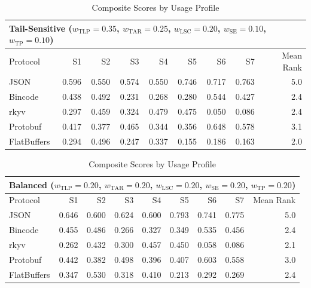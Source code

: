 \begin{table}[htbp]
\centering
\caption{Composite Scores by Usage Profile}
\label{tab:composite_scores}
\begin{tabular}{lrrrrrrrr}
\hline
\multicolumn{9}{l}{\textbf{Tail-Sensitive} ($w_{\mathrm{TLP}}=0.35$, $w_{\mathrm{TAR}}=0.25$, $w_{\mathrm{LSC}}=0.20$, $w_{\mathrm{SE}}=0.10$, $w_{\mathrm{TP}}=0.10$)} \\
\hline
Protocol & S1 & S2 & S3 & S4 & S5 & S6 & S7 & Mean Rank \\
\hline
  JSON & 0.596 & 0.550 & 0.574 & 0.550 & 0.746 & 0.717 & 0.763 & 5.0 \\
  Bincode & 0.438 & 0.492 & 0.231 & 0.268 & 0.280 & 0.544 & 0.427 & 2.4 \\
  rkyv & 0.297 & 0.459 & 0.324 & 0.479 & 0.475 & 0.050 & 0.086 & 2.4 \\
  Protobuf & 0.417 & 0.377 & 0.465 & 0.344 & 0.356 & 0.648 & 0.578 & 3.1 \\
  FlatBuffers & 0.294 & 0.496 & 0.247 & 0.337 & 0.155 & 0.186 & 0.163 & 2.0 \\
\hline
\end{tabular}
\vspace{0.5em}

\begin{tabular}{lrrrrrrrr}
\hline
\multicolumn{9}{l}{\textbf{Balanced} ($w_{\mathrm{TLP}}=0.20$, $w_{\mathrm{TAR}}=0.20$, $w_{\mathrm{LSC}}=0.20$, $w_{\mathrm{SE}}=0.20$, $w_{\mathrm{TP}}=0.20$)} \\
\hline
Protocol & S1 & S2 & S3 & S4 & S5 & S6 & S7 & Mean Rank \\
\hline
  JSON & 0.646 & 0.600 & 0.624 & 0.600 & 0.793 & 0.741 & 0.775 & 5.0 \\
  Bincode & 0.455 & 0.486 & 0.266 & 0.327 & 0.349 & 0.535 & 0.456 & 2.4 \\
  rkyv & 0.262 & 0.432 & 0.300 & 0.457 & 0.450 & 0.058 & 0.086 & 2.1 \\
  Protobuf & 0.442 & 0.382 & 0.498 & 0.396 & 0.407 & 0.603 & 0.558 & 3.0 \\
  FlatBuffers & 0.347 & 0.530 & 0.318 & 0.410 & 0.213 & 0.292 & 0.269 & 2.4 \\
\hline
\end{tabular}
\vspace{0.5em}


\end{table}
